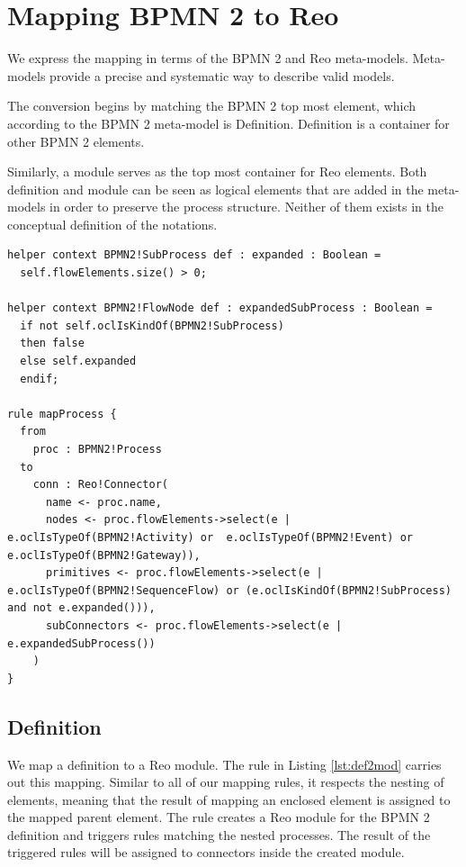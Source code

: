 \section{Mapping BPMN 2 to Reo}
\label{sec:b2r}
We express the mapping in terms of the BPMN 2 and Reo meta-models. Meta-models provide a precise and systematic way to describe valid models.

The conversion begins by matching the BPMN 2 top most element, which according to the  BPMN 2 meta-model is {Definition}. {Definition} is a container for other BPMN 2 elements.

 Similarly, a {module} serves as the top most container for Reo elements. Both {definition} and {module} can be seen as logical elements that are added in the meta-models in order to preserve the process structure. Neither of them exists in the conceptual definition of the notations. 
 
 \newpage
\begin{lstlisting}[frame=single, caption=Process mapping rule,label=lst:proc2conn]
helper context BPMN2!SubProcess def : expanded : Boolean =
  self.flowElements.size() > 0; 

helper context BPMN2!FlowNode def : expandedSubProcess : Boolean =
  if not self.oclIsKindOf(BPMN2!SubProcess) 
  then false
  else self.expanded
  endif; 

rule mapProcess {
  from
    proc : BPMN2!Process
  to 
    conn : Reo!Connector(
      name <- proc.name, 
      nodes <- proc.flowElements->select(e | e.oclIsTypeOf(BPMN2!Activity) or  e.oclIsTypeOf(BPMN2!Event) or e.oclIsTypeOf(BPMN2!Gateway)), 
      primitives <- proc.flowElements->select(e | e.oclIsTypeOf(BPMN2!SequenceFlow) or (e.oclIsKindOf(BPMN2!SubProcess) and not e.expanded())),
      subConnectors <- proc.flowElements->select(e | e.expandedSubProcess())
    )
}
\end{lstlisting} 
 
\subsection{Definition}
We map a {definition} to a Reo {module}. The rule in Listing \ref{lst:def2mod} carries out this mapping. Similar to all of our mapping rules, it respects the nesting of elements, meaning that the result of mapping an enclosed element is assigned to the mapped parent element. The rule creates a Reo {module} for the BPMN 2 {definition} and triggers rules matching the nested {process}es. The result of the triggered rules will be assigned to {connector}s inside the created {module}. 

